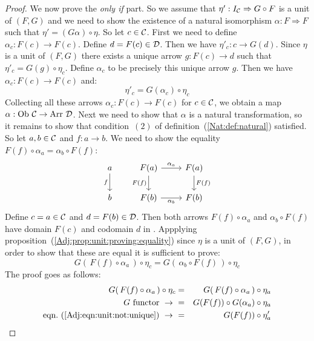 \begin{proof}
    We now prove the {\em only if} part. So we assume that 
    $\eta':I_{\cal C}\Rightarrow G\circ F$ is a unit of $(F,G)$ and we need
    to show the existence of a natural isomorphism $\alpha:F\Rightarrow F$
    such that $\eta'=(G\alpha)\circ\eta$. So let $c\in\mbox{$\cal C$}$. First we need
    to define $\alpha_{c}:F(c)\to F(c)$. Define $d=F(c)\in\mbox{$\cal D$}$. Then we 
    have $\eta'_{c}:c\to G(d)$. Since $\eta$ is a unit of $(F,G)$ there exists
    a unique arrow $g:F(c)\to d$ such that $\eta'_{c}=G(g)\circ\eta_{c}$.
    Define $\alpha_{c}$ to be precisely this unique arrow $g$. Then we 
    have $\alpha_{c}:F(c)\to F(c)$ and:
        \begin{equation}\label{Adj:eqn:unit:not:unique}
            \eta'_{c}=G(\alpha_{c})\circ\eta_{c}
        \end{equation}
    Collecting all these arrows $\alpha_{c}:F(c)\to F(c)$ for $c\in\mbox{$\cal C$}$,
    we obtain a map $\alpha:\mbox{\rm Ob}\ \mbox{$\cal C$}\to\mbox{\rm Arr}\ \mbox{$\cal D$}$. Next we need to show 
    that $\alpha$ is a natural transformation, so it remains to show that
    condition~$(2)$ of definition~(\ref{Nat:def:natural}) satisfied. So
    let $a,b\in\mbox{$\cal C$}$ and $f:a\to b$. We need to show the equality
    $F(f)\circ\alpha_{a}=\alpha_{b}\circ F(f)$:
    \[
        \begin{tikzcd}
            a\arrow[d,swap, "f"]
            &F(a)\arrow[r, "\alpha_{a}"]\arrow[d, swap,"F(f)"]
            &F(a)\arrow[d, "F(f)"]
            \\
            b
            &F(b)\arrow[r, swap, "\alpha_{b}"]
            &F(b)
        \end{tikzcd}
    \]
    Define $c=a\in\mbox{$\cal C$}$ and $d=F(b)\in\mbox{$\cal D$}$. Then both arrows 
    $F(f)\circ\alpha_{a}$ and $\alpha_{b}\circ F(f)$ have domain $F(c)$ and
    codomain $d$ in \Dat. Appplying 
    proposition~(\ref{Adj:prop:unit:proving:equality}) 
    since $\eta$ is a unit of $(F,G)$, in order to show that these are equal
    it is sufficient to prove:
        \[
            G(\,F(f)\circ\alpha_{a}\,)\circ\eta_{c}=
            G(\,\alpha_{b}\circ F(f)\,)\circ\eta_{c}
        \]
    The proof goes as follows:
        \begin{eqnarray*}G(\,F(f)\circ\alpha_{a}\,)\circ\eta_{c}
            &=&G(\,F(f)\circ\alpha_{a}\,)\circ\eta_{a}\\
            \mbox{$G$ functor}\ \to\ 
            &=&G(F(f))\circ G(\alpha_{a})\circ\eta_{a}\\
            \mbox{eqn.~(\ref{Adj:eqn:unit:not:unique})}\ \to\ 
            &=&G(F(f))\circ\eta'_{a}\\

\end{eqnarray*}
\end{proof}
